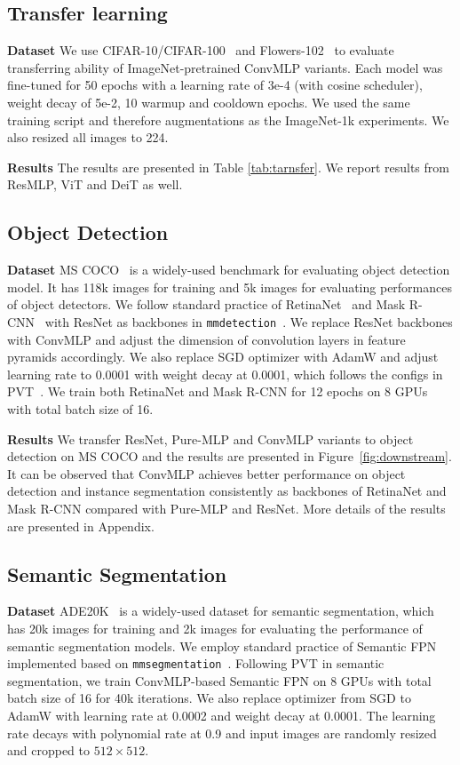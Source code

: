 \documentclass[final]{cvpr}
\begin{document}
\subsection{Transfer learning}
\noindent \textbf{Dataset} We use CIFAR-10/CIFAR-100~\cite{krizhevsky2009learning} and Flowers-102~\cite{nilsback2008automated} to evaluate transferring ability of ImageNet-pretrained ConvMLP variants. Each model was fine-tuned for 50 epochs with a learning rate of 3e-4 (with cosine scheduler), weight decay of 5e-2, 10 warmup and cooldown epochs. We used the same training script and therefore augmentations as the ImageNet-1k experiments. We also resized all images to 224.

\noindent \textbf{Results} The results are presented in Table \ref{tab:tarnsfer}. We report results from ResMLP, ViT and DeiT as well.

\subsection{Object Detection}
\noindent \textbf{Dataset} MS COCO~\cite{lin2014microsoft} is a widely-used benchmark for evaluating object detection model. It has 118k images for training and 5k images for evaluating performances of object detectors.
We follow standard practice of RetinaNet~\cite{lin2017focal} and Mask R-CNN~\cite{he2017mask} with ResNet as backbones in \verb|mmdetection|~\cite{chen2019mmdetection}. We replace ResNet backbones with ConvMLP and adjust the dimension of convolution layers in feature pyramids accordingly. We also replace SGD optimizer with AdamW and adjust learning rate to 0.0001 with weight decay at 0.0001, which follows the configs in PVT~\cite{wang2021pyramid}. We train both RetinaNet and Mask R-CNN for 12 epochs on 8 GPUs with total batch size of 16.

\noindent \textbf{Results} We transfer ResNet, Pure-MLP and ConvMLP variants to object detection on MS COCO and the results are presented in Figure~\ref{fig:downstream}. It can be observed that ConvMLP achieves better performance on object detection and instance segmentation consistently as backbones of RetinaNet and Mask R-CNN compared with Pure-MLP and ResNet. More details of the results are presented in Appendix.

\subsection{Semantic Segmentation}
\noindent \textbf{Dataset} ADE20K~\cite{zhou2017scene} is a widely-used dataset for semantic segmentation, which has 20k images for training and 2k images for evaluating the performance of semantic segmentation models. We employ standard practice of Semantic FPN~\cite{kirillov2019panoptic} implemented based on \verb|mmsegmentation|~\cite{mmseg2020}. Following PVT in semantic segmentation, we train ConvMLP-based Semantic FPN on 8 GPUs with total batch size of 16 for 40k iterations. We also replace optimizer from SGD to AdamW with learning rate at 0.0002 and weight decay at 0.0001. The learning rate decays with polynomial rate at 0.9 and input images are randomly resized and cropped to $512 \times 512$.
\end{document}
